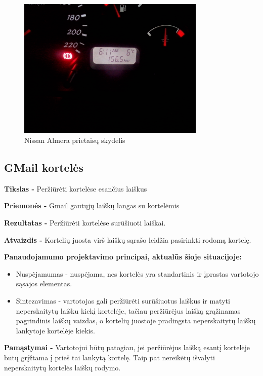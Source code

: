 ﻿\documentclass[a4paper, 12pt]{article}
\begin{document}
		\begin{figure}[h]
		\centering
		\includegraphics[width=0.8\textwidth]{images/almera.jpg}
		\caption{Nissan Almera prietaisų skydelis}
		\label{almera}
		\end{figure}
		
	\subsection{GMail kortelės}
		\textbf{Tikslas -}
		Peržiūrėti kortelėse esančius laiškus

		\textbf{Priemonės -}
		Gmail gautųjų laiškų langas su kortelėmis
		
		\textbf{Rezultatas -}
		Peržiūrėti kortelėse surūšiuoti laiškai.

		\textbf{Atvaizdis -}
		Kortelių juosta virš laiškų sąrašo leidžia pasirinkti rodomą kortelę.
		
		\textbf{Panaudojamumo projektavimo principai, aktualūs šioje situacijoje:}
		\begin{itemize}
		\item Nuspėjamumas - nuspėjama, nes kortelės yra standartinis ir įprastas vartotojo sąsajos elementas.
		\item Sintezavimas - vartotojas gali peržiūrėti surūšiuotus laiškus ir matyti neperskaitytų laišku kiekį kortelėje, tačiau peržiūrėjus laišką grąžinamas pagrindinis laiškų vaizdas, o kortelių juostoje pradingsta neperskaitytų laiškų lankytoje kortelėje kiekis.	
		\end{itemize}

		\textbf{Pamąstymai -}
		Vartotojui būtų patogiau, jei peržiūrėjus laišką esantį kortelėje būtų grįžtama į prieš tai lankytą kortelę.
		Taip pat nereikėtų išvalyti neperskaitytų kortelės laiškų rodymo.
\end{document}
